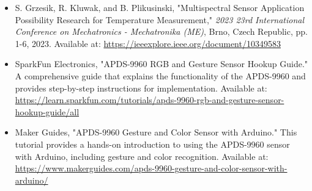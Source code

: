 \begin{itemize}
	\item S. Grzesik, R. Kluwak, and B. Plikusinski, "Multispectral Sensor Application Possibility Research for Temperature Measurement," \textit{2023 23rd International Conference on Mechatronics - Mechatronika (ME)}, Brno, Czech Republic, pp. 1-6, 2023. Available at: \url{https://ieeexplore.ieee.org/document/10349583}
	
	\item SparkFun Electronics, "APDS-9960 RGB and Gesture Sensor Hookup Guide." A comprehensive guide that explains the functionality of the APDS-9960 and provides step-by-step instructions for implementation. Available at: \url{https://learn.sparkfun.com/tutorials/apds-9960-rgb-and-gesture-sensor-hookup-guide/all}
	
	\item Maker Guides, "APDS-9960 Gesture and Color Sensor with Arduino." This tutorial provides a hands-on introduction to using the APDS-9960 sensor with Arduino, including gesture and color recognition. Available at: \url{https://www.makerguides.com/apds-9960-gesture-and-color-sensor-with-arduino/}
\end{itemize}
